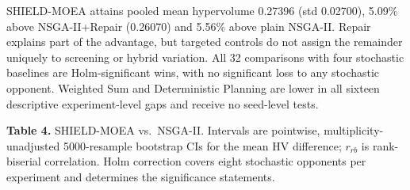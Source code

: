 \documentclass[
  10pt,
  a4paper,
]{article}
\begin{document}
SHIELD-MOEA attains pooled mean hypervolume 0.27396 (std 0.02700),
5.09\% above NSGA-II+Repair (0.26070) and 5.56\% above plain NSGA-II.
Repair explains part of the advantage, but targeted controls do not
assign the remainder uniquely to screening or hybrid variation. All 32
comparisons with four stochastic baselines are Holm-significant wins,
with no significant loss to any stochastic opponent. Weighted Sum and
Deterministic Planning are lower in all sixteen descriptive
experiment-level gaps and receive no seed-level tests.

\textbf{Table 4.} SHIELD-MOEA vs.~NSGA-II. Intervals are pointwise,
multiplicity-unadjusted 5000-resample bootstrap CIs for the mean HV
difference; \(r_{rb}\) is rank-biserial correlation. Holm correction
covers eight stochastic opponents per experiment and determines the
significance statements.
\end{document}
